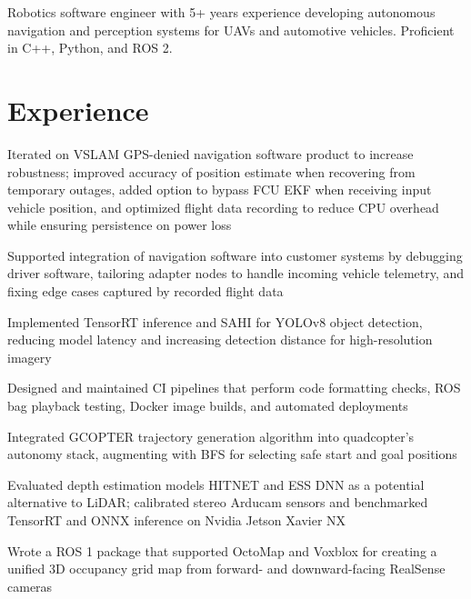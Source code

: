 \documentclass{resume}
\begin{document}


\begin{personalstatement}
  Robotics software engineer with 5+ years experience developing autonomous navigation
  and perception systems for UAVs and automotive vehicles. Proficient in C++, Python, and ROS 2.
\end{personalstatement}

\section{Experience}

\begin{details}
  \item Iterated on VSLAM GPS-denied navigation software product to increase robustness; improved accuracy
  of position estimate when recovering from temporary outages, added option to bypass FCU EKF when
  receiving input vehicle position, and optimized flight data recording to reduce CPU overhead while
  ensuring persistence on power loss
  \item Supported integration of navigation software into customer systems by debugging driver software,
  tailoring adapter nodes to handle incoming vehicle telemetry, and fixing edge cases captured by
  recorded flight data
  \item Implemented TensorRT inference and SAHI for YOLOv8 object detection, reducing model latency and
  increasing detection distance for high-resolution imagery
  \item Designed and maintained CI pipelines that perform code formatting checks, ROS bag playback testing,
  Docker image builds, and automated deployments
\end{details}

\begin{details}
  \item Integrated GCOPTER trajectory generation algorithm into quadcopter’s autonomy stack, augmenting
  with BFS for selecting safe start and goal positions
  \item Evaluated depth estimation models HITNET and ESS DNN as a potential alternative to LiDAR;
  calibrated stereo Arducam sensors and benchmarked TensorRT and ONNX inference on Nvidia Jetson
  Xavier NX
  \item Wrote a ROS 1 package that supported OctoMap and Voxblox for creating a unified 3D occupancy grid
  map from forward- and downward-facing RealSense cameras
\end{details}
\end{document}
